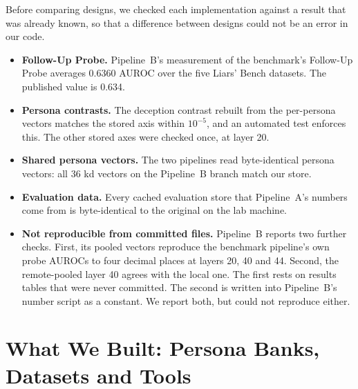 Before comparing designs, we checked each implementation against a result that was already known, so that a difference between designs could not be an error in our code.
\begin{itemize}
\item \textbf{Follow-Up Probe.} Pipeline~B's measurement of the benchmark's Follow-Up Probe averages 0.6360 AUROC over the five Liars' Bench datasets. The published value is 0.634. %
\item \textbf{Persona contrasts.} The deception contrast rebuilt from the per-persona vectors matches the stored axis within $10^{-5}$, and an automated test enforces this. The other stored axes were checked once, at layer 20. %
\item \textbf{Shared persona vectors.} The two pipelines read byte-identical persona vectors: all 36 kd vectors on the Pipeline~B branch match our store. %
\item \textbf{Evaluation data.} Every cached evaluation store that Pipeline~A's numbers come from is byte-identical to the original on the lab machine. %
\item \textbf{Not reproducible from committed files.} Pipeline~B reports two further checks. First, its pooled vectors reproduce the benchmark pipeline's own probe AUROCs to four decimal places at layers 20, 40 and 44. Second, the remote-pooled layer 40 agrees with the local one. The first rests on results tables that were never committed. The second is written into Pipeline~B's number script as a constant. We report both, but could not reproduce either. %
\end{itemize}

\section{What We Built: Persona Banks, Datasets and Tools}
\label{sec:m-built}

